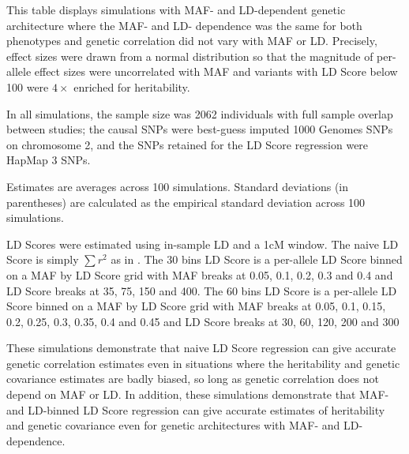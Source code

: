 This table displays simulations with MAF- and LD-dependent genetic architecture where the MAF- and LD- dependence was the same for both phenotypes and genetic correlation did not vary with MAF or LD. Precisely, effect sizes were drawn from a normal distribution so that the magnitude of per-allele effect sizes were uncorrelated with MAF and variants with LD Score below 100 were $4\times$ enriched for heritability.

In all simulations, the sample size was 2062 individuals with full sample overlap between studies; the causal SNPs were best-guess imputed 1000 Genomes SNPs on chromosome 2, and the SNPs retained for the LD Score regression were HapMap 3 SNPs. 

Estimates are averages across 100 simulations. Standard deviations (in parentheses) are calculated as the empirical standard deviation across 100 simulations.

LD Scores were estimated using in-sample LD and a 1cM window. The naive LD Score is simply $\sum r^2$ as in \cite{buliksullivan2014}. The 30 bins LD Score is a per-allele LD Score binned on a MAF by LD Score grid with MAF breaks at 0.05, 0.1, 0.2, 0.3 and 0.4 and LD Score breaks at 35, 75, 150 and 400. The 60 bins LD Score is a per-allele LD Score binned on a MAF by LD Score grid with MAF breaks at 0.05, 0.1, 0.15, 0.2, 0.25, 0.3, 0.35, 0.4 and 0.45 and LD Score breaks at 30, 60, 120, 200 and 300

These simulations demonstrate that naive LD Score regression can give accurate genetic correlation estimates even in situations where the heritability and genetic covariance estimates are badly biased, so long as genetic correlation does not depend on MAF or LD. In addition, these simulations demonstrate that MAF- and LD-binned LD Score regression can give accurate estimates of heritability and genetic covariance even for genetic architectures with MAF- and LD-dependence.